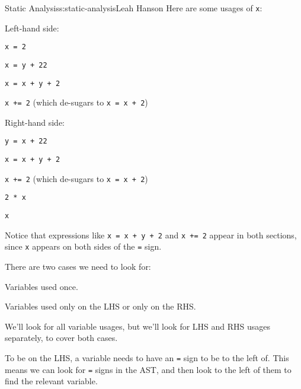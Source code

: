 \begin{aosachapter}{Static Analysis}{s:static-analysis}{Leah Hanson}
Here are some usages of \texttt{x}:

\begin{aosaitemize}

\item
  Left-hand side:

  \begin{aosaitemize}
  
  \item
    \texttt{x = 2}
  \item
    \texttt{x = y + 22}
  \item
    \texttt{x = x + y + 2}
  \item
    \texttt{x += 2} (which de-sugars to \texttt{x = x + 2})
  \end{aosaitemize}
\item
  Right-hand side:

  \begin{aosaitemize}
  
  \item
    \texttt{y = x + 22}
  \item
    \texttt{x = x + y + 2}
  \item
    \texttt{x += 2} (which de-sugars to \texttt{x = x + 2})
  \item
    \texttt{2 * x}
  \item
    \texttt{x}
  \end{aosaitemize}
\end{aosaitemize}

Notice that expressions like \texttt{x = x + y + 2} and \texttt{x += 2}
appear in both sections, since \texttt{x} appears on both sides of the
\texttt{=} sign.

\label{looking-for-single-use-variables}

There are two cases we need to look for:

\begin{aosaenumerate}
\def\labelenumi{\arabic{enumi}.}

\item
  Variables used once.
\item
  Variables used only on the LHS or only on the RHS.
\end{aosaenumerate}

We'll look for all variable usages, but we'll look for LHS and RHS
usages separately, to cover both cases.

\label{finding-lhs-usages}

To be on the LHS, a variable needs to have an \texttt{=} sign to be to
the left of. This means we can look for \texttt{=} signs in the AST, and
then look to the left of them to find the relevant variable.


\end{aosachapter}
